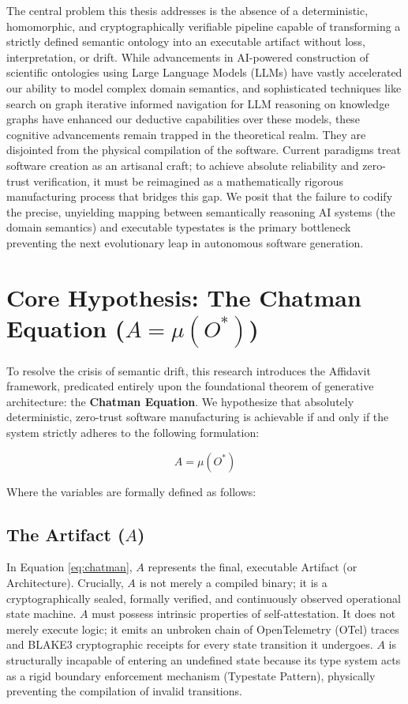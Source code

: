 The central problem this thesis addresses is the absence of a deterministic, homomorphic, and cryptographically verifiable pipeline capable of transforming a strictly defined semantic ontology into an executable artifact without loss, interpretation, or drift. While advancements in AI-powered construction of scientific ontologies using Large Language Models (LLMs) \cite{ref_TowardsNextGene0} have vastly accelerated our ability to model complex domain semantics, and sophisticated techniques like search on graph iterative informed navigation for LLM reasoning on knowledge graphs \cite{ref_SearchonGraphIt5} have enhanced our deductive capabilities over these models, these cognitive advancements remain trapped in the theoretical realm. They are disjointed from the physical compilation of the software. Current paradigms treat software creation as an artisanal craft; to achieve absolute reliability and zero-trust verification, it must be reimagined as a mathematically rigorous manufacturing process that bridges this gap. We posit that the failure to codify the precise, unyielding mapping between semantically reasoning AI systems (the domain semantics) and executable typestates is the primary bottleneck preventing the next evolutionary leap in autonomous software generation.

\section{Core Hypothesis: The Chatman Equation ($A = \mu(O^*)$)}
\label{sec:core_hypothesis}

To resolve the crisis of semantic drift, this research introduces the Affidavit framework, predicated entirely upon the foundational theorem of generative architecture: the \textbf{Chatman Equation}. We hypothesize that absolutely deterministic, zero-trust software manufacturing is achievable if and only if the system strictly adheres to the following formulation:

\begin{equation}
\label{eq:chatman}
A = \mu(O^*)
\end{equation}

Where the variables are formally defined as follows:

\subsection{The Artifact ($A$)}
In Equation \ref{eq:chatman}, $A$ represents the final, executable Artifact (or Architecture). Crucially, $A$ is not merely a compiled binary; it is a cryptographically sealed, formally verified, and continuously observed operational state machine. $A$ must possess intrinsic properties of self-attestation. It does not merely execute logic; it emits an unbroken chain of OpenTelemetry (OTel) traces and BLAKE3 cryptographic receipts for every state transition it undergoes. $A$ is structurally incapable of entering an undefined state because its type system acts as a rigid boundary enforcement mechanism (Typestate Pattern), physically preventing the compilation of invalid transitions.

